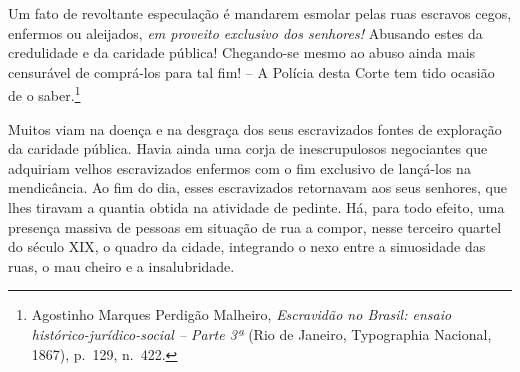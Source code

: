 Um fato de revoltante especulação é mandarem esmolar pelas ruas escravos
cegos, enfermos ou aleijados, \emph{em proveito exclusivo dos senhores!}
Abusando estes da credulidade e da caridade pública! Chegando-se mesmo
ao abuso ainda mais censurável de comprá-los para tal fim! -- A Polícia
desta Corte tem tido ocasião de o saber.\footnote{Agostinho Marques
  Perdigão Malheiro, \emph{Escravidão no Brasil: ensaio
  histórico-jurídico-social -- Parte 3ª} (Rio de Janeiro, Typographia
  Nacional, 1867), p.~129, n.~422.}

Muitos viam na doença e na desgraça dos seus escravizados fontes de
exploração da caridade pública. Havia ainda uma corja de inescrupulosos
negociantes que adquiriam velhos escravizados enfermos com o fim
exclusivo de lançá-los na mendicância. Ao fim do dia, esses escravizados
retornavam aos seus senhores, que lhes tiravam a quantia obtida na
atividade de pedinte. Há, para todo efeito, uma presença massiva de
pessoas em situação de rua a compor, nesse terceiro quartel do século
XIX, o quadro da cidade, integrando o nexo entre a sinuosidade das ruas,
o mau cheiro e a insalubridade.


